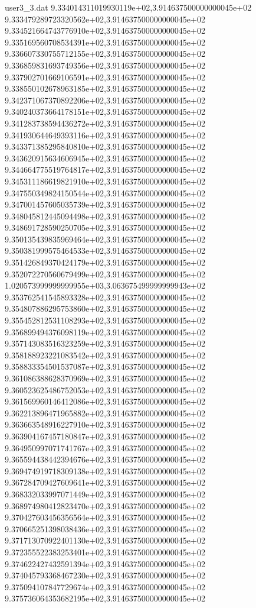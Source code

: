 \begin{filecontents}{user3_3.dat}
9.334014311019930119e+02,3.914637500000000045e+02
9.333479289723320562e+02,3.914637500000000045e+02
9.334521664743776910e+02,3.914637500000000045e+02
9.335169560708534391e+02,3.914637500000000045e+02
9.336607330755712155e+02,3.914637500000000045e+02
9.336859831693749356e+02,3.914637500000000045e+02
9.337902701669106591e+02,3.914637500000000045e+02
9.338550102678963185e+02,3.914637500000000045e+02
9.342371067370892206e+02,3.914637500000000045e+02
9.340240373664178151e+02,3.914637500000000045e+02
9.341283738594436272e+02,3.914637500000000045e+02
9.341930644649393116e+02,3.914637500000000045e+02
9.343371385295840810e+02,3.914637500000000045e+02
9.343620915634606945e+02,3.914637500000000045e+02
9.344664775519764817e+02,3.914637500000000045e+02
9.345311186619821910e+02,3.914637500000000045e+02
9.347550349824150544e+02,3.914637500000000045e+02
9.347001457605035739e+02,3.914637500000000045e+02
9.348045812445094498e+02,3.914637500000000045e+02
9.348691728590250705e+02,3.914637500000000045e+02
9.350135439835969464e+02,3.914637500000000045e+02
9.350381999575464533e+02,3.914637500000000045e+02
9.351426849370424179e+02,3.914637500000000045e+02
9.352072270560679499e+02,3.914637500000000045e+02
1.020573999999999955e+03,3.063675499999999943e+02
9.353762541545893328e+02,3.914637500000000045e+02
9.354807886295753860e+02,3.914637500000000045e+02
9.355452812531108293e+02,3.914637500000000045e+02
9.356899494376098119e+02,3.914637500000000045e+02
9.357143083516323259e+02,3.914637500000000045e+02
9.358188923221083542e+02,3.914637500000000045e+02
9.358833354501537087e+02,3.914637500000000045e+02
9.361086388628370969e+02,3.914637500000000045e+02
9.360523625486752053e+02,3.914637500000000045e+02
9.361569960146412086e+02,3.914637500000000045e+02
9.362213896471965882e+02,3.914637500000000045e+02
9.363663548916227910e+02,3.914637500000000045e+02
9.363904167457180847e+02,3.914637500000000045e+02
9.364950997071741767e+02,3.914637500000000045e+02
9.365594438442394676e+02,3.914637500000000045e+02
9.369474919718309138e+02,3.914637500000000045e+02
9.367284709427609641e+02,3.914637500000000045e+02
9.368332033997071449e+02,3.914637500000000045e+02
9.368974980412823470e+02,3.914637500000000045e+02
9.370427603456356564e+02,3.914637500000000045e+02
9.370665251398038436e+02,3.914637500000000045e+02
9.371713070922401130e+02,3.914637500000000045e+02
9.372355522383253401e+02,3.914637500000000045e+02
9.374622427432591394e+02,3.914637500000000045e+02
9.374045793368467230e+02,3.914637500000000045e+02
9.375094107847729674e+02,3.914637500000000045e+02
9.375736064353682195e+02,3.914637500000000045e+02

\end{filecontents}

